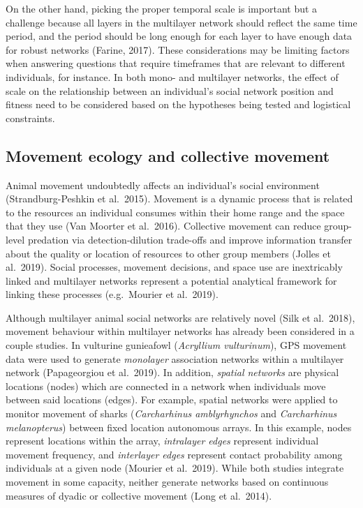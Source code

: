 \documentclass[]{article}
\begin{document}
On the other hand, picking the proper temporal scale is important but a
challenge because all layers in the multilayer network should reflect the same
time period, and the period should be long enough for each layer to have enough
data for robust networks (Farine, 2017). These considerations may be limiting
factors when answering questions that require timeframes that are relevant to
different individuals, for instance. In both mono- and multilayer networks, the
effect of scale on the relationship between an individual's social network
position and fitness need to be considered based on the hypotheses being tested
and logistical constraints.

\hypertarget{movement-ecology-and-collective-movement}{%
\subsection{Movement ecology and collective movement}\label{movement-ecology-and-collective-movement}}

Animal movement undoubtedly affects an individual's social environment
(Strandburg-Peshkin et al.~2015). Movement is a dynamic process that is related
to the resources an individual consumes within their home range and the space
that they use (Van Moorter et al.~2016). Collective movement can reduce
group-level predation via detection-dilution trade-offs and improve information
transfer about the quality or location of resources to other group members
(Jolles et al.~2019). Social processes, movement decisions, and space use are
inextricably linked and multilayer networks represent a potential analytical
framework for linking these processes (e.g.~Mourier et al.~2019).

Although multilayer animal social networks are relatively novel (Silk et
al.~2018), movement behaviour within multilayer networks has already been considered
in a couple studies. In vulturine gunieafowl (\emph{Acryllium vulturinum}), GPS
movement data were used to generate \emph{monolayer} association networks within a
multilayer network (Papageorgiou et al.~2019). In addition, \emph{spatial networks}
are physical locations (nodes) which are connected in a network when individuals
move between said locations (edges). For example, spatial networks were applied
to monitor movement of sharks (\emph{Carcharhinus amblyrhynchos} and \emph{Carcharhinus
melanopterus}) between fixed location autonomous arrays. In this example, nodes
represent locations within the array, \emph{intralayer edges} represent individual
movement frequency, and \emph{interlayer edges} represent contact probability among
individuals at a given node (Mourier et al.~2019). While both studies integrate
movement in some capacity, neither generate networks based on continuous
measures of dyadic or collective movement (Long et al.~2014).
\end{document}
